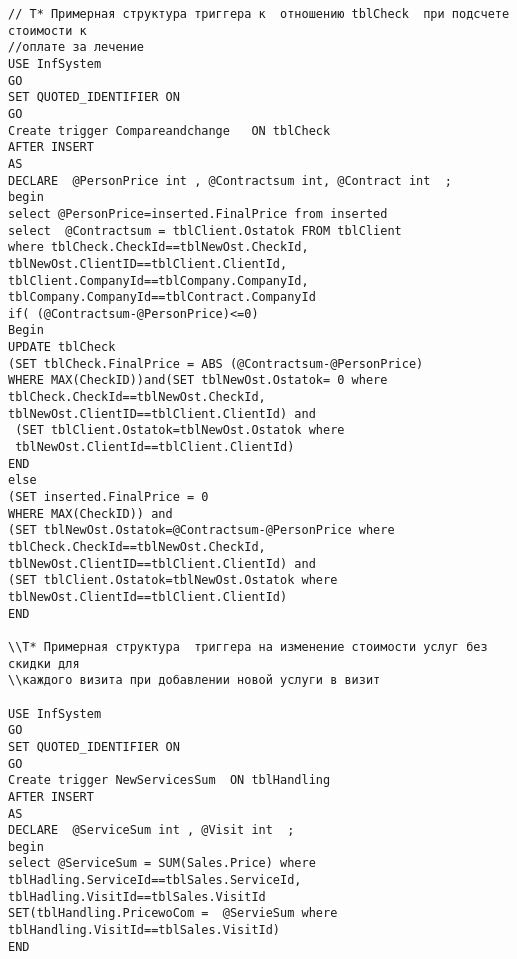 \documentclass[a4paper,12pt]{article}
\begin{document}
\clearpage
\begin{verbatim}
// T* Примерная структура триггера к  отношению tblCheck  при подсчете стоимости к
//оплате за лечение
USE InfSystem
GO
SET QUOTED_IDENTIFIER ON
GO
Create trigger Compareandchange   ON tblCheck
AFTER INSERT
AS 
DECLARE  @PersonPrice int , @Contractsum int, @Contract int  ; 
begin
select @PersonPrice=inserted.FinalPrice from inserted
select  @Contractsum = tblClient.Ostatok FROM tblClient
where tblCheck.CheckId==tblNewOst.CheckId, 
tblNewOst.ClientID==tblClient.ClientId, 
tblClient.CompanyId==tblCompany.CompanyId, 
tblCompany.CompanyId==tblContract.CompanyId
if( (@Contractsum-@PersonPrice)<=0)
Begin
UPDATE tblCheck
(SET tblCheck.FinalPrice = ABS (@Contractsum-@PersonPrice)
WHERE MAX(CheckID))and(SET tblNewOst.Ostatok= 0 where 
tblCheck.CheckId==tblNewOst.CheckId, 
tblNewOst.ClientID==tblClient.ClientId) and
 (SET tblClient.Ostatok=tblNewOst.Ostatok where 
 tblNewOst.ClientId==tblClient.ClientId)
END
else
(SET inserted.FinalPrice = 0 
WHERE MAX(CheckID)) and 
(SET tblNewOst.Ostatok=@Contractsum-@PersonPrice where 
tblCheck.CheckId==tblNewOst.CheckId, 
tblNewOst.ClientID==tblClient.ClientId) and 
(SET tblClient.Ostatok=tblNewOst.Ostatok where 
tblNewOst.ClientId==tblClient.ClientId)
END

\\T* Примерная структура  триггера на изменение стоимости услуг без скидки для
\\каждого визита при добавлении новой услуги в визит

USE InfSystem
GO
SET QUOTED_IDENTIFIER ON
GO
Create trigger NewServicesSum  ON tblHandling
AFTER INSERT
AS 
DECLARE  @ServiceSum int , @Visit int  ; 
begin
select @ServiceSum = SUM(Sales.Price) where
tblHadling.ServiceId==tblSales.ServiceId,
tblHadling.VisitId==tblSales.VisitId
SET(tblHandling.PricewoCom =  @ServieSum where 
tblHandling.VisitId==tblSales.VisitId)
END


\end{verbatim}
\end{document}
